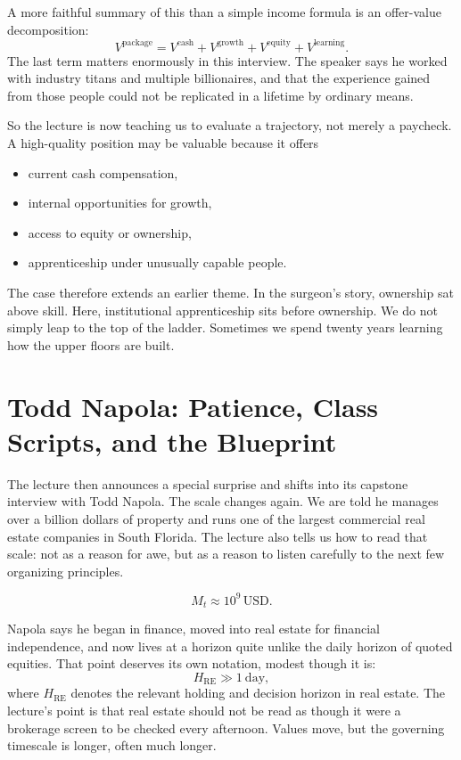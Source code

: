 A more faithful summary of this than a simple income formula is an offer-value decomposition:
\begin{equation}
V^{\text{package}}
=
V^{\text{cash}}
+
V^{\text{growth}}
+
V^{\text{equity}}
+
V^{\text{learning}}.
\end{equation}
The last term matters enormously in this interview. The speaker says he worked with industry titans and multiple billionaires, and that the experience gained from those people could not be replicated in a lifetime by ordinary means.

So the lecture is now teaching us to evaluate a trajectory, not merely a paycheck. A high-quality position may be valuable because it offers
\begin{itemize}
\item current cash compensation,
\item internal opportunities for growth,
\item access to equity or ownership,
\item apprenticeship under unusually capable people.
\end{itemize}

The case therefore extends an earlier theme. In the surgeon's story, ownership sat above skill. Here, institutional apprenticeship sits before ownership. We do not simply leap to the top of the ladder. Sometimes we spend twenty years learning how the upper floors are built.

\section{Todd Napola: Patience, Class Scripts, and the Blueprint}

The lecture then announces a special surprise and shifts into its capstone interview with Todd Napola. The scale changes again. We are told he manages over a billion dollars of property and runs one of the largest commercial real estate companies in South Florida. The lecture also tells us how to read that scale: not as a reason for awe, but as a reason to listen carefully to the next few organizing principles.

\begin{equation}
M_t \approx 10^9\,\mathrm{USD}.
\end{equation}

Napola says he began in finance, moved into real estate for financial independence, and now lives at a horizon quite unlike the daily horizon of quoted equities. That point deserves its own notation, modest though it is:
\begin{equation}
H_{\mathrm{RE}} \gg 1\ \text{day},
\end{equation}
where \(H_{\mathrm{RE}}\) denotes the relevant holding and decision horizon in real estate. The lecture's point is that real estate should not be read as though it were a brokerage screen to be checked every afternoon. Values move, but the governing timescale is longer, often much longer.

